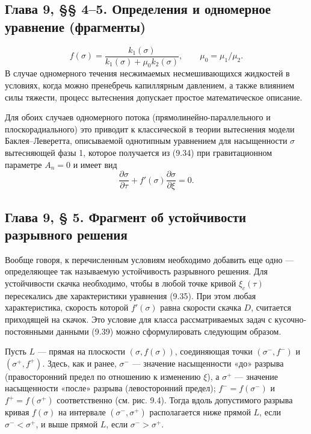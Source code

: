 \subsection*{Глава 9, §§ 4--5. Определения и одномерное уравнение (фрагменты)}
\begin{equation}f(\sigma)=\frac{k_1(\sigma)}{k_1(\sigma)+\mu_0k_2(\sigma)},\qquad\mu_0=\mu_1/\mu_2.\tag{9.22}\label{q12:eq-9-22}\end{equation}
В случае одномерного течения несжимаемых несмешивающихся жидкостей в условиях, когда можно пренебречь капиллярным давлением, а также влиянием силы тяжести, процесс вытеснения допускает простое математическое описание.

Для обоих случаев одномерного потока (прямолинейно-параллельного и плоскорадиального) это приводит к классической в теории вытеснения модели Баклея--Леверетта, описываемой однотипным уравнением для насыщенности $\sigma$ вытесняющей фазы 1, которое получается из (9.34) при гравитационном параметре $A_n=0$ и имеет вид
\begin{equation}\frac{\partial\sigma}{\partial\tau}+f'(\sigma)\frac{\partial\sigma}{\partial\xi}=0.\tag{9.35}\label{q12:eq-9-35}\end{equation}

\subsection*{Глава 9, § 5. Фрагмент об устойчивости разрывного решения}
Вообще говоря, к перечисленным условиям необходимо добавить еще одно --- определяющее так называемую устойчивость разрывного решения. Для устойчивости скачка необходимо, чтобы в любой точке кривой $\xi_c(\tau)$ пересекались две характеристики уравнения (9.35). При этом любая характеристика, скорость которой $f'(\sigma)$ равна скорости скачка $D$, считается приходящей на скачок. Это условие для класса рассматриваемых задач с кусочно-постоянными данными (9.39) можно сформулировать следующим образом.

Пусть $L$ --- прямая на плоскости $(\sigma,f(\sigma))$, соединяющая точки $(\sigma^-,f^-)$ и $(\sigma^+,f^+)$. Здесь, как и ранее, $\sigma^-$ --- значение насыщенности «до» разрыва (правосторонний предел по отношению к изменению $\xi$), а $\sigma^+$ --- значение насыщенности «после» разрыва (левосторонний предел); $f^-=f(\sigma^-)$ и $f^+=f(\sigma^+)$ соответственно (см.
рис. 9.4). Тогда вдоль допустимого разрыва кривая $f(\sigma)$ на интервале $(\sigma^-,\sigma^+)$ располагается ниже прямой $L$, если $\sigma^-<\sigma^+$, и выше прямой $L$, если $\sigma^->\sigma^+$.

